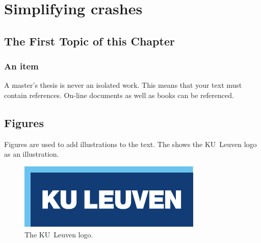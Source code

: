 \chapter{Simplifying crashes}
\label{cha:2}

%
%
%
%

%

\section{The First Topic of this Chapter}
\lipsum[78]

\subsection{An item}
A master's thesis is never an isolated work. This means that your text must
contain references. On-line documents\cite{wiki} as well as
books\cite{pratchett06:_good_omens} can be referenced.

\section{Figures}
Figures are used to add illustrations to the text. The  shows
the KU~Leuven logo as an illustration.
\begin{figure}
  \centering
  \includegraphics{logokul}
  \caption{The KU~Leuven logo.}
  \label{fig:logo}
\end{figure}


